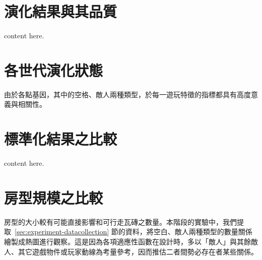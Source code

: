 \section{演化結果與其品質}
\label{sec:experiment-results}

content here.

\section{各世代演化狀態}
\label{sec:experiment-evolutions}

由於各點基因，其中的空格、敵人兩種類型，於每一遊玩特徵的指標都具有高度意義與相關性。

\section{標準化結果之比較}
\label{sec:experiment-normalized}

content here.

\section{房型規模之比較}
\label{sec:experiment-yyy}

房型的大小較有可能直接影響和可行走瓦磚之數量。本階段的實驗中，我們提取~\ref{sec:experiment-datacollection} 節的資料，將空白、敵人兩種類型的數量關係繪製成熱圖進行觀察。這是因為各項適應性函數在設計時，多以「敵人」與其餘敵人、其它遊戲物件或玩家動線為考量參考，因而推估二者間勢必存在者某些關係。

